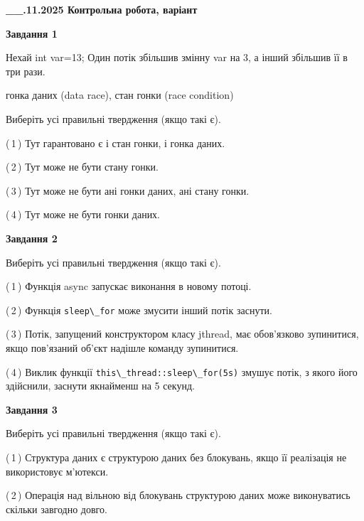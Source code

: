\documentclass[12pt, ukrainian]{article}
\def\code#1{\Verb!#1!}
\begin{document}
\begin {large}

\textbf{\_\_.11.2025 Контрольна робота, варіант  }\par


{

\begin{center}
\textbf{Завдання 1}
\end{center}
Нехай int var=13; Один потік збільшив змінну var на 3, а інший збільшив її в три рази.

гонка даних (data race), стан гонки (race condition)

Виберіть усі правильні твердження (якщо такі є).\par
\vspace{2mm}
(\,1\,) Тут гарантовано є і стан гонки, і гонка даних.%

(\,2\,) Тут може не бути стану гонки.%

(\,3\,) Тут може не бути ані гонки даних, ані стану гонки.%

(\,4\,) Тут може не бути гонки даних.%



\begin{center}
\textbf{Завдання 2}
\end{center}
Виберіть усі правильні твердження (якщо такі є).\par
\vspace{2mm}

(\,1\,) Функція async запускає виконання в новому потоці.%

(\,2\,) Функція \code{sleep\_for} може змусити інший потік заснути.%

(\,3\,) Потік, запущений конструктором класу jthread, має обов’язково зупинитися, якщо пов’язаний об’єкт надішле команду зупинитися.%

(\,4\,) Виклик функції \code{this\_thread::sleep\_for(5s)} змушує потік, з якого його здійснили, заснути якнайменш на 5 секунд.%



\begin{center}
\textbf{Завдання 3}
\end{center}
Виберіть усі правильні твердження (якщо такі є).\par
\vspace{2mm}

(\,1\,) Структура даних є структурою даних без блокувань, якщо її реалізація не використовує м’ютекси.%

(\,2\,) Операція над вільною від блокувань структурою даних може виконуватись скільки завгодно довго.%

}
\end{large}
\end{document}
